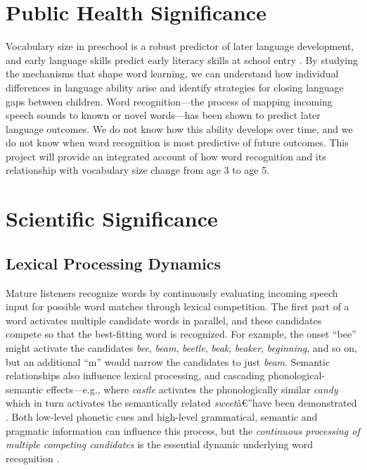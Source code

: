 \documentclass[]{book}
\newcommand{\euro}{€}
\theoremstyle{definition}
\theoremstyle{definition}
\theoremstyle{remark}
\begin{document}
\section{Public Health Significance~}\label{public-health-significance}

Vocabulary size in preschool is a robust predictor of later language
development, and early language skills predict early literacy skills at
school entry \citep{Morgan2015}. By studying the mechanisms that shape
word learning, we can understand how individual differences in language
ability arise and identify strategies for closing language gaps between
children. Word recognition---the process of mapping incoming speech
sounds to known or novel words---has been shown to predict later
language outcomes. We do not know how this ability develops over time,
and we do not know when word recognition is most predictive of future
outcomes. This project will provide an integrated account of how word
recognition and its relationship with vocabulary size change from age 3
to age 5.

\section{Scientific Significance}\label{scientific-significance}

\subsection{Lexical Processing
Dynamics}\label{lexical-processing-dynamics}

Mature listeners recognize words by continuously evaluating incoming
speech input for possible word matches through lexical competition. The
first part of a word activates multiple candidate words in parallel, and
these candidates compete so that the best-fitting word is recognized.
For example, the onset ``bee'' might activate the candidates \emph{bee},
\emph{beam}, \emph{beetle}, \emph{beak}, \emph{beaker},
\emph{beginning}, and so on, but an additional ``m'' would narrow the
candidates to just \emph{beam}. Semantic relationships also influence
lexical processing, and cascading phonological-semantic effects---e.g.,
where \emph{castle} activates the phonologically similar \emph{candy}
which in turn activates the semantically related
\emph{sweet}â\euro{}''have been demonstrated \citep{Marslen-Wilson1989}.
Both low-level phonetic cues and high-level grammatical, semantic and
pragmatic information can influence this process, but the
\emph{continuous processing of multiple competing candidates} is the
essential dynamic underlying word recognition \citep{Magnuson2013}.
\end{document}
